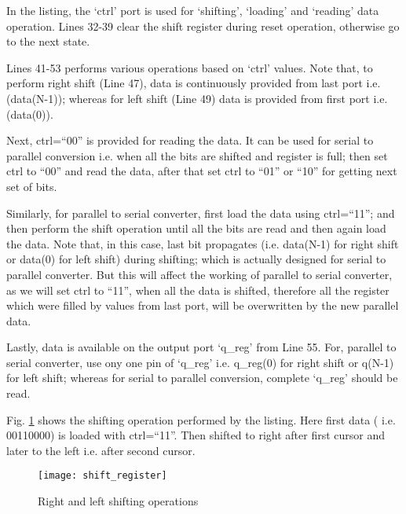 \begin{explanation}
	In the listing, the `ctrl' port is used for `shifting', `loading' and `reading' data operation. Lines 32-39 clear the shift register during reset operation, otherwise go to the next state. 
	
	Lines 41-53 performs various operations based on `ctrl' values. Note that, to perform right shift (Line 47), data is continuously provided from last port i.e. (data(N-1)); whereas for left shift (Line 49) data is provided from first port i.e. (data(0)). 
	
	Next, ctrl=``00'' is provided for reading the data. It can be used for serial to parallel conversion i.e. when all the bits are shifted and register is full; then set ctrl to ``00'' and read the data, after that set ctrl to ``01'' or ``10'' for getting next set of bits. 
	
	Similarly, for parallel to serial converter, first load the data using ctrl=``11''; and then perform the shift operation until all the bits are read and then again load the data. Note that, in this case, last bit propagates (i.e. data(N-1) for right shift or data(0) for left shift) during shifting; which is actually designed for serial to parallel converter. But this will affect the working of parallel to serial converter, as we will set ctrl to ``11'', when all the data is shifted, therefore all the register which were filled by values from last port, will be overwritten by the new parallel data. 
	
	Lastly, data is available on the output port `q\_reg' from Line 55. For, parallel to serial converter, use ony one pin of `q\_reg' i.e. q\_reg(0) for right shift or q(N-1) for left shift; whereas for serial to parallel conversion, complete  `q\_reg' should be read.
	
	Fig. \ref{fig:shift_register} shows the shifting operation performed by the listing. Here first data ( i.e. 00110000) is loaded with ctrl=``11''. Then shifted to right after first cursor and later to the left i.e. after second cursor.
	
	\begin{figure}[!h]
		\centering
		\texttt{[image: shift\_register]}
		\caption{Right and left shifting operations}
		\label{fig:shift_register}
	\end{figure}	 
\end{explanation}



